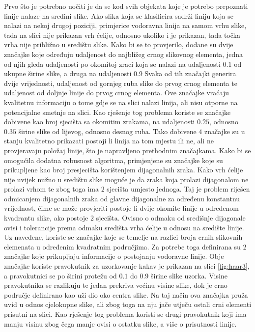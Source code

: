 \documentclass[times, utf8, zavrsni, numeric]{fer}
\begin{document}
Prvo što je potrebno uočiti je da se kod svih objekata koje je potrebo prepoznati linije nalaze na sredini slike.
Ako slika koja se klasificira sadrži liniju koja se nalazi na nekoj drugoj poziciji, primjerice vodoravna linija na samom vrhu slike, tada na slici nije prikazan vrh ćelije, odnosno ukoliko i je prikazan, tada točka vrha nije približno u središtu slike.
Kako bi se to provjerilo, dodane su dvije značajke koje određuju udaljenost do najbližeg crnog slikovnog elementa, jedna od njih gleda udaljenosti po okomitoj zraci koja se nalazi na udaljenosti $0.1$ od ukupne širine slike, a druga na udaljenosti $0.9$
Svaka od tih značajki generira dvije vrijednosti, udaljenost od gornjeg ruba slike do prvog crnog elementa te udaljenost od doljnje linije do prvog crnog elementa.
Ove značajke vraćaju kvalitetnu informaciju o tome gdje se na slici nalazi linija, ali nisu otporne na potencijalne smetnje na slici.
Kao rješenje tog problema koriste se značajke dobivene kao broj sjecišta sa okomitim zrakama, na udaljenosti $0.25$, odnosno $0.35$ širine slike od lijevog, odnosno desnog ruba.
Tako dobivene $4$ značajke su u stanju kvalitetno prikazati postoji li linija na tom mjestu ili ne, ali ne provjeravaju položaj linije, što je napravljeno prethodnim značajkama.
Kako bi se omogućila dodatna robusnost algoritma, primjenjene su značajke koje su prikupljene kao broj presjecišta korištenjem dijagonalnih zraka.
Kako vrh ćelije nije uvijek nužno u središtu slike moguće je da zraka koja prolazi dijagonalom ne prolazi vrhom te zbog toga ima $2$ sjecišta umjesto jednoga.
Taj je problem riješen odmicanjem dijagonalnih zraka od glavne dijagonalne za određenu konstantnu vrijednost, čime se može provjeriti postoje li dvije okomite linije u određenom kvadrantu slike, ako postoje $2$ sjecišta.
Ovisno o odmaku od središnje dijagonale ovisi i tolerancije prema odmaku središta vrha ćelije u odnosu na središte linije.
Uz navedene, koriste se značajke koje se temelje na razlici broja crnih slikovnih elemenata u određenim kvadratnim područjima.
Za potrebe toga definirana su $2$ značajke koje prikupljaju informacije o postojanju vodoravne linije. 
Obje značajke koriste pravokutnik za uzorkovanje kakav je prikazan na slici \ref{fig:haar3}, a pravokutnici se po širini protežu od $0.1$ do $0.9$ širine slike uzorka.
Visine pravokutnika se razlikuju te jedan prekriva većinu visine slike, dok je crno područje definirano kao uži dio oko centra slike.
Na taj način ova značajka pruža uvid u odnos cjelokupne slike, ali zbog toga na nju jače utječu ostali crni elementi prisutni na slici.
Kao rješenje tog problema koristi se drugi pravokutnik koji ima manju visinu zbog čega manje ovisi o ostatku slike, a više o prisutnosti linije.
\end{document}
